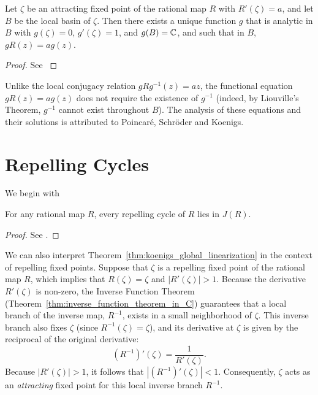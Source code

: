 \begin{theorem}
    \label{thm:koenigs_global_linearization}
    Let $\zeta$ be an attracting fixed point of the rational map $R$ with
    $R'(\zeta) = a$, and let $B$ be the local basin of $\zeta$. Then there
    exists a unique function $g$ that is analytic in $B$ with $g(\zeta) = 0$,
    $g'(\zeta) = 1$, and $g(B) = \mathbb{C}$, and such that in $B$, $g R(z) = a g(z)$.
\end{theorem}
\begin{proof}
    See \cite[108--109]{Beardon1991}
\end{proof}

\begin{remark}
    Unlike the local conjugacy relation $g R g^{-1}(z) = az$, the functional
    equation $g R(z) = a g(z)$ does not require the existence of $g^{-1}$
    (indeed, by Liouville's Theorem, $g^{-1}$ cannot exist throughout $B$). The
    analysis of these equations and their solutions is attributed to Poincaré,
    Schröder and Koenigs.
\end{remark}

\section{Repelling Cycles}
\label{sec:repelling_cycles}

We begin with

\begin{theorem}
    \label{thm:repelling_cycles_are_in_J}
    For any rational map $R$, every repelling cycle of $R$ lies in $J(R)$.
\end{theorem}
\begin{proof}
    See \cite[109--110]{Beardon1991}.
\end{proof}

We can also interpret Theorem~\ref{thm:koenigs_global_linearization} in the
context of repelling fixed points. Suppose that $\zeta$ is a repelling fixed
point of the rational map $R$, which implies that $R(\zeta) = \zeta$ and
$|R'(\zeta)| > 1$. Because the derivative $R'(\zeta)$ is non-zero, the Inverse
Function Theorem (Theorem~\ref{thm:inverse_function_theorem_in_C}) guarantees
that a local branch of the inverse map, $R^{-1}$, exists in a small neighborhood
of $\zeta$. This inverse branch also fixes $\zeta$ (since $R^{-1}(\zeta) =
\zeta$), and its derivative at $\zeta$ is given by the reciprocal of the
original derivative:
\begin{equation*}
    (R^{-1})'(\zeta) = \frac{1}{R'(\zeta)}.
\end{equation*}
Because $|R'(\zeta)| > 1$, it follows that $|(R^{-1})'(\zeta)| < 1$.
Consequently, $\zeta$ acts as an \emph{attracting} fixed point for this local
inverse branch $R^{-1}$. 

